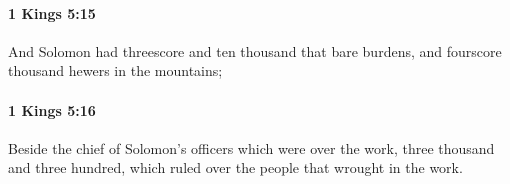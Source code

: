 		\paragraph{1 Kings 5:15} %
			\label{1KINGS-5-15}

			And Solomon had threescore and ten thousand that bare burdens, and fourscore thousand hewers in the mountains;


		\paragraph{1 Kings 5:16} %
			\label{1KINGS-5-16}

			Beside the chief of Solomon’s officers which were over the work, three thousand and three hundred, which ruled over the people that wrought in the work.


